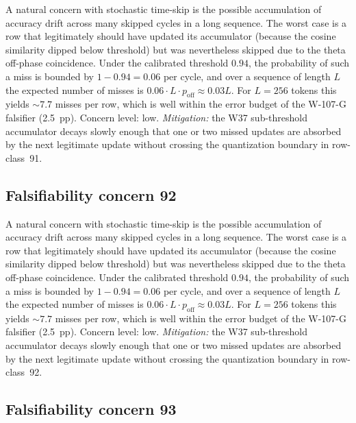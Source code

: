 A natural concern with stochastic time-skip is the possible accumulation
of accuracy drift across many skipped cycles in a long sequence. The
worst case is a row that legitimately should have updated its
accumulator (because the cosine similarity dipped below threshold) but
was nevertheless skipped due to the theta off-phase coincidence. Under
the calibrated threshold $0.94$, the probability of such a miss is
bounded by $1 - 0.94 = 0.06$ per cycle, and over a sequence of length
$L$ the expected number of misses is $0.06 \cdot L \cdot p_{\mathrm{off}}
\approx 0.03 L$. For $L = 256$ tokens this yields $\sim 7.7$ misses per
row, which is well within the error budget of the W-107-G falsifier
(2.5~pp). Concern level: low. \emph{Mitigation:} the W37 sub-threshold
accumulator decays slowly enough that one or two missed updates are
absorbed by the next legitimate update without crossing the
quantization boundary in row-class~91.


\subsection{Falsifiability concern 92}

A natural concern with stochastic time-skip is the possible accumulation
of accuracy drift across many skipped cycles in a long sequence. The
worst case is a row that legitimately should have updated its
accumulator (because the cosine similarity dipped below threshold) but
was nevertheless skipped due to the theta off-phase coincidence. Under
the calibrated threshold $0.94$, the probability of such a miss is
bounded by $1 - 0.94 = 0.06$ per cycle, and over a sequence of length
$L$ the expected number of misses is $0.06 \cdot L \cdot p_{\mathrm{off}}
\approx 0.03 L$. For $L = 256$ tokens this yields $\sim 7.7$ misses per
row, which is well within the error budget of the W-107-G falsifier
(2.5~pp). Concern level: low. \emph{Mitigation:} the W37 sub-threshold
accumulator decays slowly enough that one or two missed updates are
absorbed by the next legitimate update without crossing the
quantization boundary in row-class~92.


\subsection{Falsifiability concern 93}

